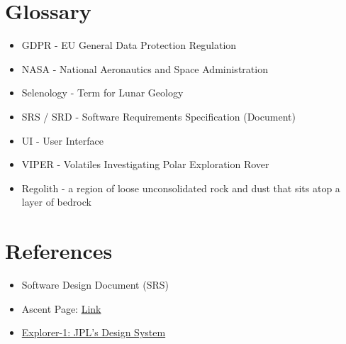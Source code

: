 \documentclass{article}
\begin{document}
\section{Glossary}
\begin{itemize}
	\item GDPR - EU General Data Protection Regulation
	\item NASA - National Aeronautics and Space Administration
	\item Selenology - Term for Lunar Geology
	\item SRS / SRD - Software Requirements Specification (Document)
	\item UI - User Interface
	\item VIPER - Volatiles Investigating Polar Exploration Rover
	\item Regolith - a region of loose unconsolidated rock and dust that sits atop a layer of bedrock
\end{itemize}

\section{References}
\begin{itemize}
	\item Software Design Document (SRS)
	\item Ascent Page: \href{https://ascent.cysun.org/project/project/view/227}{Link}
	\item \href{https://github.com/nasa-jpl/explorer-1}{Explorer-1: JPL's Design System}
\end{itemize}
\end{document}
